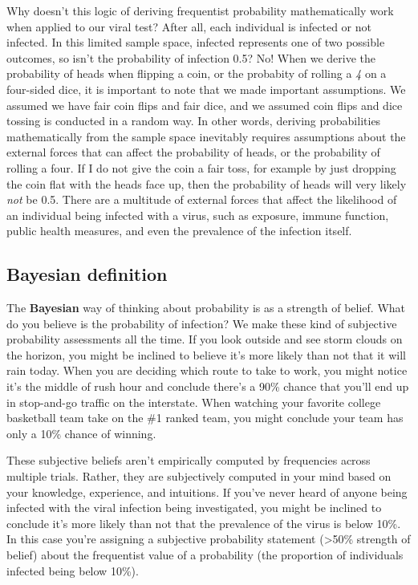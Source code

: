 \documentclass[
]{book}
\begin{document}
Why doesn't this logic of deriving frequentist probability mathematically work when applied to our viral test? After all, each individual is infected or not infected. In this limited sample space, infected represents one of two possible outcomes, so isn't the probability of infection 0.5? No! When we derive the probability of heads when flipping a coin, or the probabity of rolling a \emph{4} on a four-sided dice, it is important to note that we made important assumptions. We assumed we have fair coin flips and fair dice, and we assumed coin flips and dice tossing is conducted in a random way. In other words, deriving probabilities mathematically from the sample space inevitably requires assumptions about the external forces that can affect the probability of heads, or the probability of rolling a four. If I do not give the coin a fair toss, for example by just dropping the coin flat with the heads face up, then the probability of heads will very likely \emph{not} be 0.5. There are a multitude of external forces that affect the likelihood of an individual being infected with a virus, such as exposure, immune function, public health measures, and even the prevalence of the infection itself.

\subsection{Bayesian definition}\label{bayesian-definition}

The \textbf{Bayesian} way of thinking about probability is as a strength of belief. What do you believe is the probability of infection? We make these kind of subjective probability assessments all the time. If you look outside and see storm clouds on the horizon, you might be inclined to believe it's more likely than not that it will rain today. When you are deciding which route to take to work, you might notice it's the middle of rush hour and conclude there's a 90\% chance that you'll end up in stop-and-go traffic on the interstate. When watching your favorite college basketball team take on the \#1 ranked team, you might conclude your team has only a 10\% chance of winning.

These subjective beliefs aren't empirically computed by frequencies across multiple trials. Rather, they are subjectively computed in your mind based on your knowledge, experience, and intuitions. If you've never heard of anyone being infected with the viral infection being investigated, you might be inclined to conclude it's more likely than not that the prevalence of the virus is below 10\%. In this case you're assigning a subjective probability statement (\textgreater50\% strength of belief) about the frequentist value of a probability (the proportion of individuals infected being below 10\%).
\end{document}
